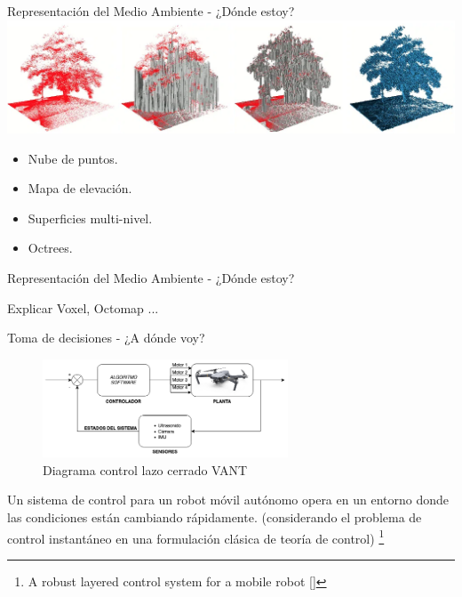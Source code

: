\documentclass[
  24pt, %
  aspectratio=169, %
]{beamer}
\begin{document}
\begin{frame}{Representación del Medio Ambiente - ¿Dónde estoy?}
  \bigskip %
  \centering
  \includegraphics[width=1\textwidth,height=0.35\textheight]{img4}\footnotemark
  \vspace{2pt}\\
  \bigskip %
  
  \begin{itemize}
  \item Nube de puntos.
  \item Mapa de elevación.
  \item Superficies multi-nivel.
  \item Octrees.
  \end{itemize}
  
\end{frame}

\begin{frame}{Representación del Medio Ambiente - ¿Dónde estoy?}
  
  Explicar Voxel, Octomap ...
  
\end{frame}

\begin{frame}{Toma de decisiones - ¿A dónde voy?}
  \begin{figure}[h]
    \includegraphics[width=0.65\textwidth]{control_drone.png}
    \caption{Diagrama control lazo cerrado VANT}
  \end{figure}
  \bigskip %
  \small Un sistema de control para un robot móvil autónomo opera en un entorno donde las condiciones están cambiando rápidamente. (considerando el problema de control instantáneo en una formulación clásica de teoría de control) \footnote{A robust layered control system for a mobile robot [\cite{brooks_robot}]}
  
\end{frame}
\end{document}
